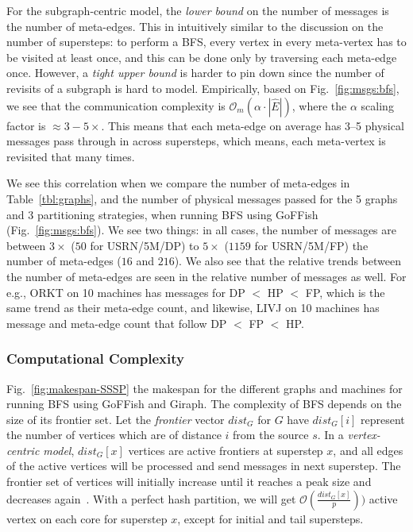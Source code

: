 \documentclass[10pt,conference, compsocconf]{IEEEtran}
\begin{document}
For the subgraph-centric model, the \emph{lower bound} on the number of messages is the number of meta-edges. This in intuitively similar to the discussion on the number of supersteps: to perform a BFS, every vertex in every meta-vertex has to be visited at least once, and this can be done only by traversing each meta-edge once. However, a \emph{tight upper bound} is harder to pin down since the number of revisits of a subgraph is hard to model. Empirically, based on Fig.~\ref{fig:msgs:bfs}, we see that the communication complexity is $\mathcal{O}_m(\alpha \cdot |\widehat{E}|)$, where the $\alpha$ scaling factor is $\approx 3 - 5\times$. This means that each meta-edge on average has 3--5 physical messages pass through in across supersteps, which means, each meta-vertex is revisited that many times.

We see this correlation when we compare the number of meta-edges in Table~\ref{tbl:graphs}, and the number of physical messages passed for the 5 graphs and 3 partitioning strategies, when running BFS using GoFFish (Fig.~\ref{fig:msgs:bfs}). We see two things: in all cases, the number of messages are between $3\times$ ($50$ for USRN/5M/DP) to $5\times$ ($1159$ for USRN/5M/FP) the number of meta-edges ($16$ and $216$). We also see that the relative trends between the number of meta-edges are seen in the relative number of messages as well. For e.g., ORKT on 10 machines has messages for DP $<$ HP $<$ FP, which is the same trend as their meta-edge count, and likewise, LIVJ on 10 machines has message and meta-edge count that follow DP $<$ FP $<$ HP.



\subsubsection{{Computational Complexity}}

Fig.~\ref{fig:makespan-SSSP} the makespan for the different graphs and machines for running BFS using GoFFish and Giraph. The complexity of BFS depends on the size of its frontier set. Let the \emph{frontier} vector $dist_G$ for $G$ have $dist_G[i]$ represent the number of vertices which are of distance $i$ from the source $s$. In a \emph{vertex-centric model}, $dist_G[x]$ vertices are active frontiers at superstep $x$, and all edges of the active vertices will be processed and send messages in next superstep. The frontier set of vertices will initially increase until it reaches a peak size and decreases again~\cite{beamer2013direction}.  With a perfect hash partition, we will get $\mathcal{O}(\frac{dist_G[x]}{p}))$ active vertex on each core for superstep $x$, except for initial and tail supersteps.
 
\end{document}
